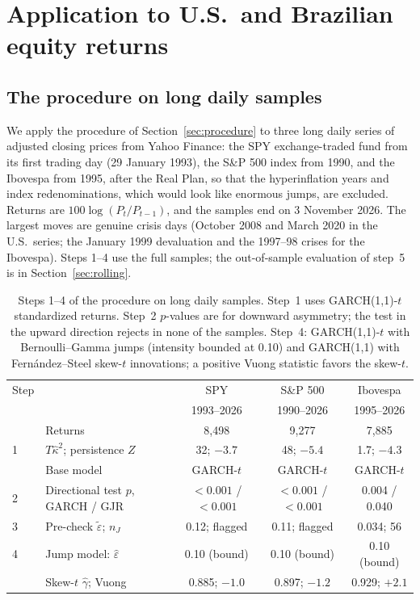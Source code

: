 \documentclass[11pt,a4paper]{article}
\theoremstyle{definition}
\theoremstyle{remark}
\begin{document}
\section{Application to U.S.\ and Brazilian equity returns}\label{sec:data}
\subsection{The procedure on long daily samples}\label{sec:daily}
We apply the procedure of Section~\ref{sec:procedure} to three long daily series of adjusted closing prices from Yahoo Finance: the SPY exchange-traded fund from its first trading day (29 January 1993), the S\&P 500 index from 1990, and the Ibovespa from 1995, after the Real Plan, so that the hyperinflation years and index redenominations, which would look like enormous jumps, are excluded. Returns are $100\log(P_t/P_{t-1})$, and the samples end on 3 November 2026. The largest moves are genuine crisis days (October 2008 and March 2020 in the U.S.\ series; the January 1999 devaluation and the 1997--98 crises for the Ibovespa). Steps 1--4 use the full samples; the out-of-sample evaluation of step~5 is in Section~\ref{sec:rolling}.

\begin{table}[ht]\centering\footnotesize\setlength{\tabcolsep}{4pt}
\caption{Steps 1--4 of the procedure on long daily samples. Step~1 uses GARCH(1,1)-$t$ standardized returns. Step~2 $p$-values are for downward asymmetry; the test in the upward direction rejects in none of the samples. Step~4: GARCH(1,1)-$t$ with Bernoulli--Gamma jumps (intensity bounded at 0.10) and GARCH(1,1) with Fern\'andez--Steel skew-$t$ innovations; a positive Vuong statistic favors the skew-$t$.}\label{tab:daily}
\begin{tabular}{llccc}
\toprule
Step & & SPY & S\&P 500 & Ibovespa\\
 & & 1993--2026 & 1990--2026 & 1995--2026\\
\midrule
 & Returns & 8{,}498 & 9{,}277 & 7{,}885\\
1 & $T\hat\kappa^2$; persistence $Z$ & 32; $-3.7$ & 48; $-5.4$ & 1.7; $-4.3$\\
 & Base model & GARCH-$t$ & GARCH-$t$ & GARCH-$t$\\
2 & Directional test $p$, GARCH / GJR & $<0.001$ / $<0.001$ & $<0.001$ / $<0.001$ & 0.004 / 0.040\\
3 & Pre-check $\tilde\varepsilon$; $n_J$ & 0.12; flagged & 0.11; flagged & 0.034; 56\\
4 & Jump model: $\hat\varepsilon$ & 0.10 (bound) & 0.10 (bound) & 0.10 (bound)\\
 & Skew-$t$ $\hat\gamma$; Vuong & 0.885; $-1.0$ & 0.897; $-1.2$ & 0.929; $+2.1$\\
\bottomrule
\end{tabular}
\end{table}
\end{document}
